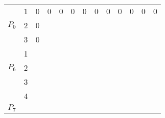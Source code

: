 \documentclass[11pt]{article}
\begin{document}
\begin{small}
{\begin{tabular}{ccc|c|c|c|c|c|c|c|c|c|c|}
 
\multicolumn{1}{|c|}{\multirow{3}{*}{$P_0$}} & \multicolumn{1}{c|}{1}
 & 0 & 0 & 0 & 0 & 0 & 0 & 0 & 0 & 0 & 0 & 0 \\ \cline{2-13} 
\multicolumn{1}{|c|}{}                       & \multicolumn{1}{c|}{2}
 & 0 &  &  &  &  &  &  &  &  &  &  \\ \cline{2-13} 
\multicolumn{1}{|c|}{}                       & \multicolumn{1}{c|}{3}
  & 0 &  &  &  &  &  &  &  &  &  &  \\ \hline
 
\multicolumn{1}{|c|}{\multirow{3}{*}{$P_6$}} & \multicolumn{1}{c|}{1}
  &  &  &  &  &  &  &  &  &  &  &  \\ \cline{2-13} 
\multicolumn{1}{|c|}{}                       & \multicolumn{1}{c|}{2}
  &  &  &  &  &  &  &  &  &  &  &  \\ \cline{2-13} 
\multicolumn{1}{|c|}{}                       & \multicolumn{1}{c|}{3}
  &  &  &  &  &  &  &  &  &  &  &  \\ \cline{2-13} 
\multicolumn{1}{|c|}{}                       & \multicolumn{1}{c|}{4}
  &  &  &  &  &  &  &  &  &  &  &  \\ \hline
 
\multicolumn{1}{|c|}{\multirow{3}{*}{$P_7$}} & \multicolumn{1}{c|}{}
  &  &  &  &  &  &  &  &  &  &  &  \\ \cline{2-13} 
\multicolumn{1}{|c|}{}                       & \multicolumn{1}{c|}{}
  &  &  &  &  &  &  &  &  &  &  &  \\ \cline{2-13} 
\multicolumn{1}{|c|}{}                       & \multicolumn{1}{c|}{}
  &  &  &  &  &  &  &  &  &  &  &  \\ \hline
\end{tabular}

}

\end{small}
\end{document}
